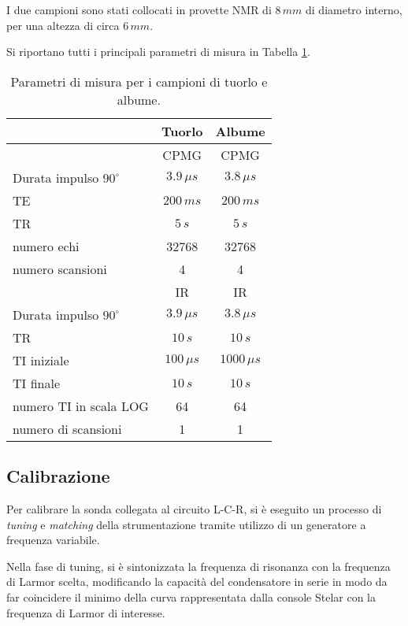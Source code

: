 I due campioni sono stati collocati in provette NMR di $8\si{\,}{mm}$ di diametro interno, per una altezza di circa $6\si{\,}{mm}$.

Si riportano tutti i principali parametri di misura in Tabella \ref{tab:setup}.

\begin{table}[ht]
	\centering
	\begin{tabular}{|l|c|c|}
	\toprule
						& \textbf{Tuorlo}& \textbf{Albume}	\\
	\midrule
						& CPMG 			& CPMG 				\\
	\midrule
	Durata impulso $90^{\circ}$ & $3.9\si{\,}{\mu s} $& $3.8\si{\,}{\mu s}$ \\
	TE 					& $200\si{\,}{ms} $	& $200\si{\,}{ms}$ \\
	TR 					& $5\si{\,}{s}$ 	& $5\si{\,}{s}$ \\
	numero echi 		& 32768 		& 32768 \\
	numero scansioni 	& 4 			& 4 \\
	\midrule
	\midrule
						& IR			& IR				\\
	\midrule
	Durata impulso $90^{\circ}$ & $3.9\si{\,}{\mu s} $& $3.8\si{\,}{\mu s}$ \\
	TR 					& $10\si{\,}{s}$	& $10\si{\,}{s}$ \\
	TI iniziale 	 	&$100\si{\,}{\mu s}$& $1000\si{\,}{\mu s}$ \\
	TI finale 		 	& $10\si{\,}{s}$	& $10\si{\,}{s}$ \\
	numero TI in scala LOG & 64			& 64 \\
	numero di scansioni & 1				& 1 \\
	\bottomrule
	\end{tabular}
	\caption{Parametri di misura per i campioni di tuorlo e albume.}
	\label{tab:setup}
\end{table}


\subsection*{Calibrazione}

Per calibrare la sonda collegata al circuito L-C-R, si è eseguito un processo di \textit{tuning} e \textit{matching} della strumentazione tramite utilizzo di un generatore a frequenza variabile.

Nella fase di tuning, si è sintonizzata la frequenza di risonanza con la frequenza di Larmor scelta, modificando la capacità del condensatore in serie in modo da far coincidere il minimo della curva rappresentata dalla console Stelar con la frequenza di Larmor di interesse.

